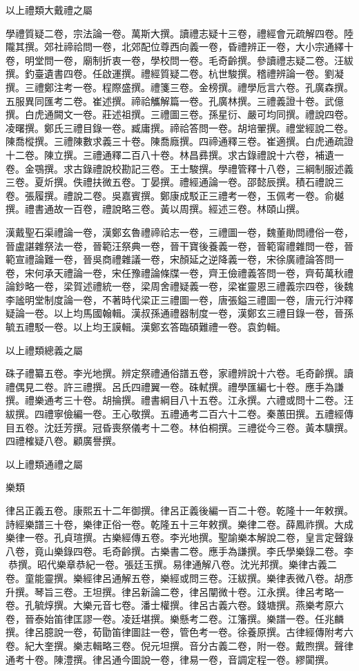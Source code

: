 \begin{pinyinscope}
以上禮類大戴禮之屬

學禮質疑二卷，宗法論一卷。萬斯大撰。讀禮志疑十三卷，禮經會元疏解四卷。陸隴其撰。郊社禘祫問一卷，北郊配位尊西向義一卷，昏禮辨正一卷，大小宗通繹十卷，明堂問一卷，廟制折衷一卷，學校問一卷。毛奇齡撰。參讀禮志疑二卷。汪紱撰。釣臺遺書四卷。任啟運撰。禮經質疑二卷。杭世駿撰。稽禮辨論一卷。劉凝撰。三禮鄭注考一卷。程際盛撰。禮箋三卷。金榜撰。禮學卮言六卷。孔廣森撰。五服異同匯考二卷。崔述撰。禘祫觿解篇一卷。孔廣林撰。三禮義證十卷。武億撰。白虎通闕文一卷。莊述祖撰。三禮圖三卷。孫星衍、嚴可均同撰。禮說四卷。凌曙撰。鄭氏三禮目錄一卷。臧庸撰。禘祫答問一卷。胡培翬撰。禮堂經說二卷。陳喬樅撰。三禮陳數求義三十卷。陳喬廕撰。四禘通釋三卷。崔適撰。白虎通疏證十二卷。陳立撰。三禮通釋二百八十卷。林昌彞撰。求古錄禮說十六卷，補遺一卷。金鶚撰。求古錄禮說校勘記三卷。王士駿撰。學禮管釋十八卷，三綱制服述義三卷。夏炘撰。佚禮扶微五卷。丁晏撰。禮經通論一卷。邵懿辰撰。積石禮說三卷。張履撰。禮說二卷。吳嘉賓撰。鄭康成駁正三禮考一卷，玉佩考一卷。俞樾撰。禮書通故一百卷，禮說略三卷。黃以周撰。經述三卷。林頤山撰。

漢戴聖石渠禮論一卷，漢鄭玄魯禮禘祫志一卷，三禮圖一卷，魏董勛問禮俗一卷，晉盧諶雜祭法一卷，晉範汪祭典一卷，晉干寶後養義一卷，晉範甯禮雜問一卷，晉範宣禮論難一卷，晉吳商禮雜議一卷，宋顏延之逆降義一卷，宋徐廣禮論答問一卷，宋何承天禮論一卷，宋任豫禮論條牒一卷，齊王儉禮義答問一卷，齊荀萬秋禮論鈔略一卷，梁賀述禮統一卷，梁周舍禮疑義一卷，梁崔靈恩三禮義宗四卷，後魏李謐明堂制度論一卷，不著時代梁正三禮圖一卷，唐張鎰三禮圖一卷，唐元行沖釋疑論一卷。以上均馬國翰輯。漢叔孫通禮器制度一卷，漢鄭玄三禮目錄一卷，晉孫毓五禮駁一卷。以上均王謨輯。漢鄭玄答臨碩難禮一卷。袁鈞輯。

以上禮類總義之屬

硃子禮纂五卷。李光地撰。辨定祭禮通俗譜五卷，家禮辨說十六卷。毛奇齡撰。讀禮偶見二卷。許三禮撰。呂氏四禮翼一卷。硃軾撰。禮學匯編七十卷。應手為謙撰。禮樂通考三十卷。胡掄撰。禮書綱目八十五卷。江永撰。六禮或問十二卷。汪紱撰。四禮寧儉編一卷。王心敬撰。五禮通考二百六十二卷。秦蕙田撰。五禮經傳目五卷。沈廷芳撰。冠昏喪祭儀考十二卷。林伯桐撰。三禮從今三卷。黃本驥撰。四禮榷疑八卷。顧廣譽撰。

以上禮類通禮之屬

樂類

律呂正義五卷。康熙五十二年御撰。律呂正義後編一百二十卷。乾隆十一年敕撰。詩經樂譜三十卷，樂律正俗一卷。乾隆五十三年敕撰。樂律二卷。薛鳳祚撰。大成樂律一卷。孔貞瑄撰。古樂經傳五卷。李光地撰。聖諭樂本解說二卷，皇言定聲錄八卷，竟山樂錄四卷。毛奇齡撰。古樂書二卷。應手為謙撰。李氏學樂錄二卷。李恭撰。昭代樂章恭紀一卷。張廷玉撰。易律通解八卷。沈光邦撰。樂律古義二卷。童能靈撰。樂經律呂通解五卷，樂經或問三卷。汪紱撰。樂律表微八卷。胡彥升撰。琴旨三卷。王坦撰。律呂新論二卷，律呂闡微十卷。江永撰。律呂考略一卷。孔毓焞撰。大樂元音七卷。潘士權撰。律呂古義六卷。錢塘撰。燕樂考原六卷，晉泰始笛律匡謬一卷。凌廷堪撰。樂懸考二卷。江籓撰。樂譜一卷。任兆麟撰。律呂臆說一卷，荀勖笛律圖註一卷，管色考一卷。徐養原撰。古律經傳附考六卷。紀大奎撰。樂志輯略三卷。倪元坦撰。音分古義二卷，附一卷。戴煦撰。聲律通考十卷。陳澧撰。律呂通今圖說一卷，律易一卷，音調定程一卷。繆闐撰。


\end{pinyinscope}
